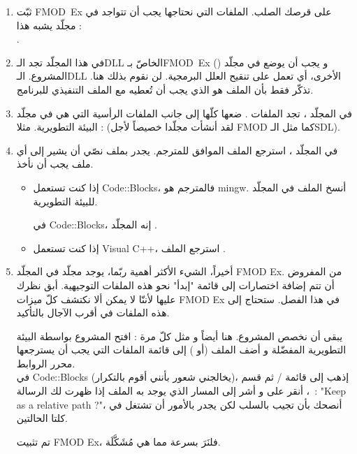 \begin{enumerate}
	\item ثبّت
	\mbox{\textenglish{FMOD Ex}}
على قرصك الصلب. الملفات التي نحتاجها يجب أن تتواجد في مجلّد يشبه هذا :\\
	.
	\item في هذا المجلّد تجد الـ\textenglish{DLL}
	الخاصّ بـ\mbox{\textenglish{FMOD Ex}}
	()
	و يجب أن يوضع في مجلّد المشروع. الـ\textenglish{DLL}
	الأخرى، أي
	تعمل على تنقيح العلل البرمجية. لن نقوم بذلك هنا. تذكّر فقط بأن الملف
	هو الذي يجب أن تُعطيه مع الملف التنفيذي للبرنامج.
	\item في المجلّد
	،
	تجد الملفات
	.
	ضعها كلّها إلى جانب الملفات الرأسية التي هي في مجلّد البيئة التطويرية. مثلا :
	(لقد أنشأت مجلّدا خصيصاً لأجل
	\textenglish{FMOD}
	كما مثل الـ\textenglish{SDL}).
	\item في المجلّد
	،
	استرجع الملف الموافق للمترجم. يجدر بملف نصّي أن يشير إلى أي ملف يجب أن نأخذ.
	\begin{itemize}
		\item إذا كنت تستعمل
		\textenglish{Code::Blocks}،
		فالمترجم هو
		\textenglish{mingw}.
		أنسخ الملف
		في المجلّد
		للبيئة التطويرية.
		
		في
		\textenglish{Code::Blocks}،
		إنه المجلّد
		.
		\item إذا كنت تستعمل
		\textenglish{Visual C++}،
		استرجع الملف
		.
	\end{itemize}
	\item أخيراً، الشيء الأكثر أهمية ربّما، يوجد مجلّد 
	في المجلّد
	\textenglish{FMOD Ex}.
	من المفروض أن تتم إضافة اختصارات إلى قائمة "إبدأ" نحو هذه الملفات التوجيهية. أبق نظرك عليها لأننّا لا يمكن ألا نكتشف كلّ ميزات
	\textenglish{FMOD Ex}
	في هذا الفصل. ستحتاج إلى هذه الملفات في أقرب الآجال بالتأكيد.
	
	يبقى أن نخصص المشروع. هنا أيضاً و مثل كلّ مرة : افتح المشروع بواسطة البيئة التطويرية المفضّلة و أضف الملف
	(أو
	)
	إلى قائمة الملفات التي يجب أن يسترجعها محرر الروابط.\\
	في
	\textenglish{Code::Blocks}
	(يخالجني شعور بأنني أقوم بالتكرار)، إذهب إلى قائمة
	 / 
	ثم قسم
	،
	أنقر على
	و أشر إلى المسار الذي يوجد به الملف
	إذا ظهرت لك الرسالة~:
	"\textenglish{Keep as a relative path ?}"،
	أنصحك بأن تجيب بالسلب لكن يجدر بالأمور أن تشتغل في كلتا الحالتين.
	
	تم تثبيت
	\textenglish{FMOD Ex}،
	فلنَرَ بسرعة مما هي مُشَكَّلَة.
\end{enumerate}

